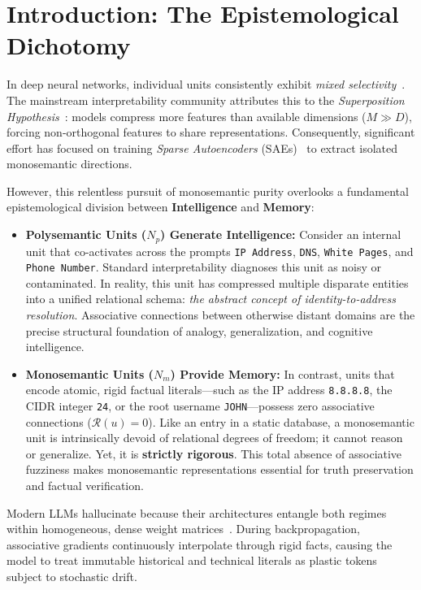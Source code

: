 \documentclass[10pt,twocolumn]{article}
\theoremstyle{definition}
\begin{document}
\section{Introduction: The Epistemological Dichotomy}
In deep neural networks, individual units consistently exhibit \textit{mixed selectivity}~\cite{rigotti2013importance, elhage2022toy}. The mainstream interpretability community attributes this to the \textit{Superposition Hypothesis}~\cite{elhage2022toy}: models compress more features than available dimensions ($M \gg D$), forcing non-orthogonal features to share representations. Consequently, significant effort has focused on training \textit{Sparse Autoencoders} (SAEs)~\cite{bricken2023monosemanticity, templeton2024scaling} to extract isolated monosemantic directions.

However, this relentless pursuit of monosemantic purity overlooks a fundamental epistemological division between \textbf{Intelligence} and \textbf{Memory}:
\begin{itemize}[leftmargin=*, itemsep=1.5pt, topsep=2pt]
    \item \textbf{Polysemantic Units ($N_p$) Generate Intelligence:} Consider an internal unit that co-activates across the prompts \texttt{IP Address}, \texttt{DNS}, \texttt{White Pages}, and \texttt{Phone Number}. Standard interpretability diagnoses this unit as noisy or contaminated. In reality, this unit has compressed multiple disparate entities into a unified relational schema: \textit{the abstract concept of identity-to-address resolution}. Associative connections between otherwise distant domains are the precise structural foundation of analogy, generalization, and cognitive intelligence.
    \item \textbf{Monosemantic Units ($N_m$) Provide Memory:} In contrast, units that encode atomic, rigid factual literals---such as the IP address \texttt{8.8.8.8}, the CIDR integer \texttt{24}, or the root username \texttt{JOHN}---possess zero associative connections ($\mathcal{R}(u)=0$). Like an entry in a static database, a monosemantic unit is intrinsically devoid of relational degrees of freedom; it cannot reason or generalize. Yet, it is \textbf{strictly rigorous}. This total absence of associative fuzziness makes monosemantic representations essential for truth preservation and factual verification.
\end{itemize}

Modern LLMs hallucinate because their architectures entangle both regimes within homogeneous, dense weight matrices~\cite{geva2021transformer}. During backpropagation, associative gradients continuously interpolate through rigid facts, causing the model to treat immutable historical and technical literals as plastic tokens subject to stochastic drift.
\end{document}
